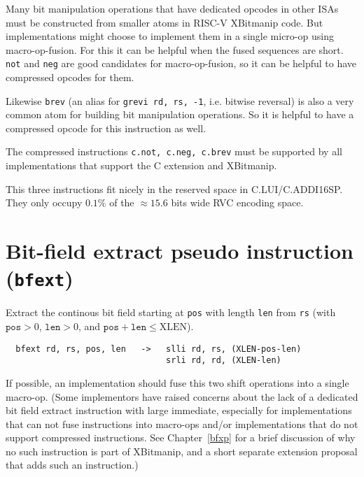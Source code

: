 Many bit manipulation operations that have dedicated opcodes in other ISAs
must be constructed from smaller atoms in RISC-V XBitmanip code. But
implementations might choose to implement them in a single micro-op using
macro-op-fusion. For this it can be helpful when the fused sequences are short.
\texttt{not} and \texttt{neg} are good candidates for macro-op-fusion, so
it can be helpful to have compressed opcodes for them.

Likewise \texttt{brev} (an alias for \texttt{grevi\ rd,\ rs,\ -1}, i.e. bitwise
reversal) is also a very common atom for building bit manipulation operations. So it
is helpful to have a compressed opcode for this instruction as well.

The compressed instructions \texttt{c.not,\ c.neg,\ c.brev} must be supported by
all implementations that support the C extension and XBitmanip.



This three instructions fit nicely in the reserved space in C.LUI/C.ADDI16SP.
They only occupy $0.1\%$ of the $\approx15.6$ bits wide RVC encoding space.


\section{Bit-field extract pseudo instruction ({\tt bfext})}

Extract the continous bit field starting at {\tt pos} with length {\tt len}
from {\tt rs} (with $\texttt{pos}>0$, $\texttt{len}>0$, and
$\texttt{pos}+\texttt{len}\le\textrm{XLEN}$).

\begin{verbatim}
  bfext rd, rs, pos, len   ->   slli rd, rs, (XLEN-pos-len)
                                srli rd, rd, (XLEN-len)
\end{verbatim}

If possible, an implementation should fuse this two shift operations into a single
macro-op. (Some implementors have raised concerns about the lack of a dedicated
bit field extract instruction with large immediate, especially for implementations
that can not fuse instructions into macro-ops and/or implementations that do
not support compressed instructions. See Chapter~\ref{bfxp} for a brief discussion
of why no such instruction is part of XBitmanip, and a short separate extension
proposal that adds such an instruction.)
